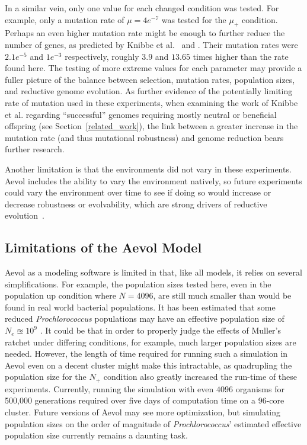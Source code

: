 In a similar vein, only one value for each changed condition was tested. For example, only a mutation rate of $\mu = 4e^{-7}$ was tested for the $\mu_+$ condition. Perhaps an even higher mutation rate might be enough to further reduce the number of genes, as predicted by Knibbe et al.~\cite{Knibbe2007} and \cite{Liard.2018}. Their mutation rates were $2.1e^{-5}$ and $1e^{-3}$ respectively, roughly $3.9$ and $13.65$ times higher than the rate found here. The testing of more extreme values for each parameter may provide a fuller picture of the balance between selection, mutation rates, population sizes, and reductive genome evolution. As further evidence of the potentially limiting rate of mutation used in these experiments, when examining the work of Knibbe et al. regarding ``successful'' genomes requiring mostly neutral or beneficial offspring (see Section~\ref{related_work}), the link between a greater increase in the mutation rate (and thus mutational robustness) and genome reduction bears further research. 

Another limitation is that the environments did not vary in these experiments. Aevol includes the ability to vary the environment natively, so future experiments could vary the environment over time to see if doing so would increase or decrease robustness or evolvability, which are strong drivers of reductive evolution~\cite{Batut.2013}. 

\subsection{Limitations of the Aevol Model}
Aevol as a modeling software is limited in that, like all models, it relies on several simplifications. For example, the population sizes tested here, even in the population up condition where $N = 4096$, are still much smaller than would be found in real world bacterial populations. It has been estimated that some reduced \textit{Prochlorococcus} populations may have an effective population size of $N_e \approxeq 10^9$ \cite{kashtan2014single}. It could be that in order to properly judge the effects of Muller's ratchet under differing conditions, for example, much larger population sizes are needed. However, the length of time required for running such a simulation in Aevol even on a decent cluster might make this intractable, as quadrupling the population size for the $N_+$ condition also greatly increased the run-time of these experiments. Currently, running the simulation with even $4096$ organisms for 500,000 generations required over five days of computation time on a 96-core cluster. Future versions of Aevol may see more optimization, but simulating population sizes on the order of magnitude of \textit{Prochlorococcus}' estimated effective population size currently remains a daunting task.  

